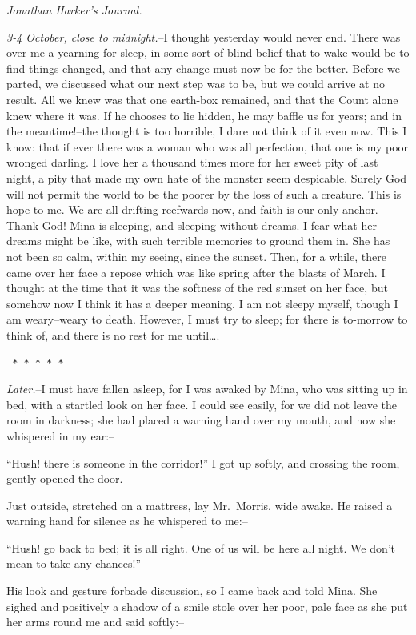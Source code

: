 \documentclass[12pt,openright]{book}
\begin{document}
\textit{Jonathan Harker’s Journal.}

\textit{3-4 October, close to midnight.}–I thought yesterday would never end. There was over me a yearning for sleep, in some sort of blind belief that to wake would be to find things changed, and that any change must now be for the better. Before we parted, we discussed what our next step was to be, but we could arrive at no result. All we knew was that one earth-box remained, and that the Count alone knew where it was. If he chooses to lie hidden, he may baffle us for years; and in the meantime!–the thought is too horrible, I dare not think of it even now. This I know: that if ever there was a woman who was all perfection, that one is my poor wronged darling. I love her a thousand times more for her sweet pity of last night, a pity that made my own hate of the monster seem despicable. Surely God will not permit the world to be the poorer by the loss of such a creature. This is hope to me. We are all drifting reefwards now, and faith is our only anchor. Thank God! Mina is sleeping, and sleeping without dreams. I fear what her dreams might be like, with such terrible memories to ground them in. She has not been so calm, within my seeing, since the sunset. Then, for a while, there came over her face a repose which was like spring after the blasts of March. I thought at the time that it was the softness of the red sunset on her face, but somehow now I think it has a deeper meaning. I am not sleepy myself, though I am weary–weary to death. However, I must try to sleep; for there is to-morrow to think of, and there is no rest for me until….

\texttt{   *       *       *       *       *}

\textit{Later.}–I must have fallen asleep, for I was awaked by Mina, who was sitting up in bed, with a startled look on her face. I could see easily, for we did not leave the room in darkness; she had placed a warning hand over my mouth, and now she whispered in my ear:–

“Hush! there is someone in the corridor!” I got up softly, and crossing the room, gently opened the door.

Just outside, stretched on a mattress, lay Mr. Morris, wide awake. He raised a warning hand for silence as he whispered to me:–

“Hush! go back to bed; it is all right. One of us will be here all night. We don’t mean to take any chances!”

His look and gesture forbade discussion, so I came back and told Mina. She sighed and positively a shadow of a smile stole over her poor, pale face as she put her arms round me and said softly:–
\end{document}
